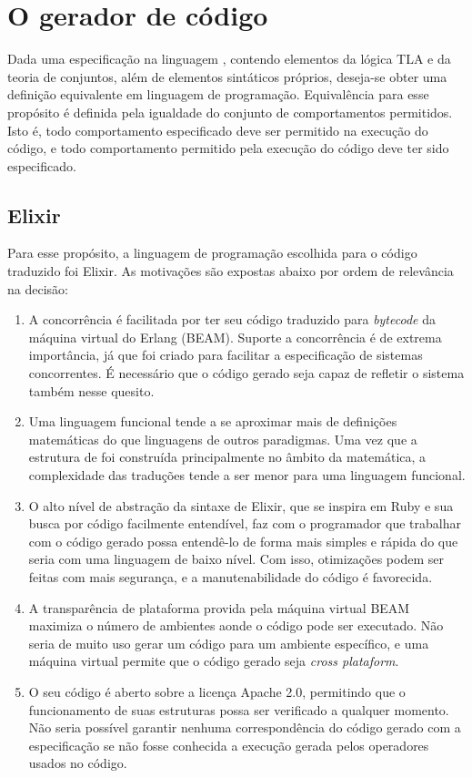\chapter{O gerador de código}
\label{cap3}

Dada uma especificação na linguagem \TLAA, contendo elementos da lógica TLA e da teoria de conjuntos, além de elementos sintáticos próprios, deseja-se obter uma definição equivalente em linguagem de programação. Equivalência para esse propósito é definida pela igualdade do conjunto de comportamentos permitidos. Isto é, todo comportamento especificado deve ser permitido na execução do código, e todo comportamento permitido pela execução do código deve ter sido especificado.

\section{Elixir}
\label{elixir}

Para esse propósito, a linguagem de programação escolhida para o código traduzido foi Elixir. As motivações são expostas abaixo por ordem de relevância na decisão:
\begin{enumerate}
  \item A concorrência é facilitada por ter seu código traduzido para \textit{bytecode} da máquina virtual do Erlang (BEAM). Suporte a concorrência é de extrema importância, já que \TLA foi criado para facilitar a especificação de sistemas concorrentes. É necessário que o código gerado seja capaz de refletir o sistema também nesse quesito.

  \item Uma linguagem funcional tende a se aproximar mais de definições matemáticas do que linguagens de outros paradigmas. Uma vez que a estrutura de \TLA foi construída principalmente no âmbito da matemática, a complexidade das traduções tende a ser menor para uma linguagem funcional.

  \item O alto nível de abstração da sintaxe de Elixir, que se inspira em Ruby e sua busca por código facilmente entendível, faz com o programador que trabalhar com o código gerado possa entendê-lo de forma mais simples e rápida do que seria com uma linguagem de baixo nível. Com isso, otimizações podem ser feitas com mais segurança, e a manutenabilidade do código é favorecida.

  \item A transparência de plataforma provida pela máquina virtual BEAM maximiza o número de ambientes aonde o código pode ser executado. Não seria de muito uso gerar um código para um ambiente específico, e uma máquina virtual permite que o código gerado seja \textit{cross plataform}.

  \item O seu código é aberto sobre a licença Apache 2.0, permitindo que o funcionamento de suas estruturas possa ser verificado a qualquer momento. Não seria possível garantir nenhuma correspondência do código gerado com a especificação se não fosse conhecida a execução gerada pelos operadores usados no código.

\end{enumerate}


